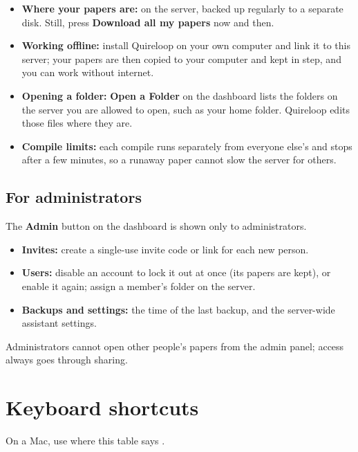 \documentclass[11pt]{article}
\newcommand{\key}[1]{\fbox{\footnotesize\texttt{#1}}}
\newcommand{\ui}[1]{\textbf{#1}}
\begin{document}
\begin{itemize}
  \item \textbf{Where your papers are:} on the server, backed up regularly to a
    separate disk. Still, press \ui{Download all my papers} now and then.
  \item \textbf{Working offline:} install Quireloop on your own computer and link
    it to this server; your papers are then copied to your computer and kept in
    step, and you can work without internet.
  \item \textbf{Opening a folder:} \ui{Open a Folder} on the dashboard lists the
    folders on the server you are allowed to open, such as your home folder.
    Quireloop edits those files where they are.
  \item \textbf{Compile limits:} each compile runs separately from everyone
    else's and stops after a few minutes, so a runaway paper cannot slow the
    server for others.
\end{itemize}

\subsection{For administrators}\label{sec:admin}
The \ui{Admin} button on the dashboard is shown only to administrators.
\begin{itemize}
  \item \textbf{Invites:} create a single-use invite code or link for each new
    person.
  \item \textbf{Users:} disable an account to lock it out at once (its papers are
    kept), or enable it again; assign a member's folder on the server.
  \item \textbf{Backups and settings:} the time of the last backup, and the
    server-wide assistant settings.
\end{itemize}
Administrators cannot open other people's papers from the admin panel; access
always goes through sharing.

\section{Keyboard shortcuts}

On a Mac, use \key{Cmd} where this table says \key{Ctrl}.
\end{document}
